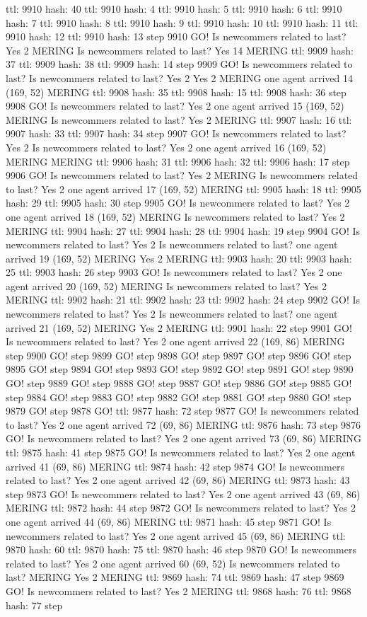 ttl: 9910 hash: 40 ttl: 9910 hash: 4 ttl: 9910 hash: 5 ttl: 9910 hash: 6 ttl: 9910 hash: 7 ttl: 9910 hash: 8 ttl: 9910 hash: 9 ttl: 9910 hash: 10 ttl: 9910 hash: 11 ttl: 9910 hash: 12 ttl: 9910 hash: 13 step 9910 GO! Is newcommers related to last? Yes 2 MERING Is newcommers related to last? Yes 14 MERING ttl: 9909 hash: 37 ttl: 9909 hash: 38 ttl: 9909 hash: 14 step 9909 GO! Is newcommers related to last? Is newcommers related to last? Yes 2 Yes 2 MERING one agent arrived 14 (169, 52) MERING ttl: 9908 hash: 35 ttl: 9908 hash: 15 ttl: 9908 hash: 36 step 9908 GO! Is newcommers related to last? Yes 2 one agent arrived 15 (169, 52) MERING Is newcommers related to last? Yes 2 MERING ttl: 9907 hash: 16 ttl: 9907 hash: 33 ttl: 9907 hash: 34 step 9907 GO! Is newcommers related to last? Yes 2 Is newcommers related to last? Yes 2 one agent arrived 16 (169, 52) MERING MERING ttl: 9906 hash: 31 ttl: 9906 hash: 32 ttl: 9906 hash: 17 step 9906 GO! Is newcommers related to last? Yes 2 MERING Is newcommers related to last? Yes 2 one agent arrived 17 (169, 52) MERING ttl: 9905 hash: 18 ttl: 9905 hash: 29 ttl: 9905 hash: 30 step 9905 GO! Is newcommers related to last? Yes 2 one agent arrived 18 (169, 52) MERING Is newcommers related to last? Yes 2 MERING ttl: 9904 hash: 27 ttl: 9904 hash: 28 ttl: 9904 hash: 19 step 9904 GO! Is newcommers related to last? Yes 2 Is newcommers related to last? one agent arrived 19 (169, 52) MERING Yes 2 MERING ttl: 9903 hash: 20 ttl: 9903 hash: 25 ttl: 9903 hash: 26 step 9903 GO! Is newcommers related to last? Yes 2 one agent arrived 20 (169, 52) MERING Is newcommers related to last? Yes 2 MERING ttl: 9902 hash: 21 ttl: 9902 hash: 23 ttl: 9902 hash: 24 step 9902 GO! Is newcommers related to last? Yes 2 Is newcommers related to last? one agent arrived 21 (169, 52) MERING Yes 2 MERING ttl: 9901 hash: 22 step 9901 GO! Is newcommers related to last? Yes 2 one agent arrived 22 (169, 86) MERING step 9900 GO! step 9899 GO! step 9898 GO! step 9897 GO! step 9896 GO! step 9895 GO! step 9894 GO! step 9893 GO! step 9892 GO! step 9891 GO! step 9890 GO! step 9889 GO! step 9888 GO! step 9887 GO! step 9886 GO! step 9885 GO! step 9884 GO! step 9883 GO! step 9882 GO! step 9881 GO! step 9880 GO! step 9879 GO! step 9878 GO! ttl: 9877 hash: 72 step 9877 GO! Is newcommers related to last? Yes 2 one agent arrived 72 (69, 86) MERING ttl: 9876 hash: 73 step 9876 GO! Is newcommers related to last? Yes 2 one agent arrived 73 (69, 86) MERING ttl: 9875 hash: 41 step 9875 GO! Is newcommers related to last? Yes 2 one agent arrived 41 (69, 86) MERING ttl: 9874 hash: 42 step 9874 GO! Is newcommers related to last? Yes 2 one agent arrived 42 (69, 86) MERING ttl: 9873 hash: 43 step 9873 GO! Is newcommers related to last? Yes 2 one agent arrived 43 (69, 86) MERING ttl: 9872 hash: 44 step 9872 GO! Is newcommers related to last? Yes 2 one agent arrived 44 (69, 86) MERING ttl: 9871 hash: 45 step 9871 GO! Is newcommers related to last? Yes 2 one agent arrived 45 (69, 86) MERING ttl: 9870 hash: 60 ttl: 9870 hash: 75 ttl: 9870 hash: 46 step 9870 GO! Is newcommers related to last? Yes 2 one agent arrived 60 (69, 52) Is newcommers related to last? MERING Yes 2 MERING ttl: 9869 hash: 74 ttl: 9869 hash: 47 step 9869 GO! Is newcommers related to last? Yes 2 MERING ttl: 9868 hash: 76 ttl: 9868 hash: 77 step 